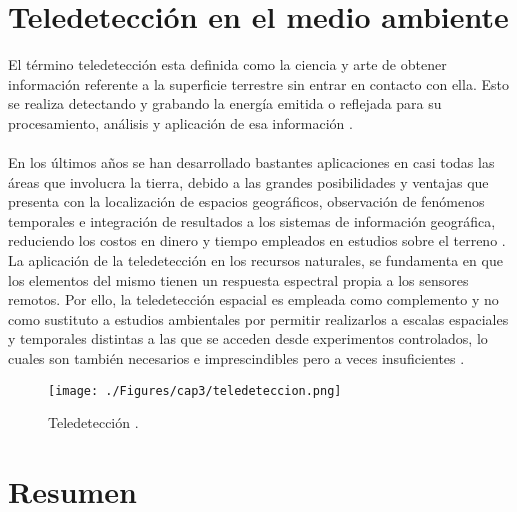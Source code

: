 \section{Teledetecci\'on en el medio ambiente}
El t\'ermino teledetecci\'on esta definida como la ciencia y arte de obtener informaci\'on referente a la superficie terrestre sin entrar en contacto con ella. Esto se realiza detectando y grabando la energ\'ia emitida o reflejada para su procesamiento, an\'alisis y aplicaci\'on de esa informaci\'on \cite{salinero2002teledeteccion}.\\~\\
En los \'ultimos a\~{n}os se han desarrollado bastantes aplicaciones en casi todas las \'areas que involucra la tierra, debido a las grandes posibilidades y ventajas que presenta con la localizaci\'on de espacios geogr\'aficos, observaci\'on de fen\'omenos temporales e integraci\'on de resultados a los sistemas de informaci\'on geogr\'afica, reduciendo los costos en dinero y tiempo empleados en estudios sobre el terreno \cite{baker2006mapping}. La aplicaci\'on de la teledetecci\'on en los recursos naturales, se fundamenta en que los elementos del mismo tienen un respuesta espectral propia a los sensores remotos. Por ello, la teledetecci\'on espacial es empleada como complemento y no como sustituto a estudios ambientales por permitir realizarlos a escalas espaciales y temporales distintas a las que se acceden desde experimentos controlados, lo cuales son tambi\'en necesarios e imprescindibles pero a veces insuficientes \cite{perez2011aplicaciones}.

	\begin{figure}[H]
		\centering
		\texttt{[image: ./Figures/cap3/teledeteccion.png]}
		\caption{Teledetecci\'on \cite{teledet2015perce}.}
		\label{fig:tele}
	\end{figure}

\section{Resumen}

